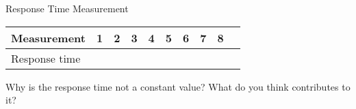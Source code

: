 \documentclass[10pt,a4paper,titlepage,oneside]{article}
\begin{document}
\begin{qa}{Response Time Measurement}
\begin{center}
\begin{tabular}{|l|c|c|c|c|c|c|c|c|c|}
	\hline
	Measurement   & 1 & 2 & 3 & 4 & 5 & 6 & 7 & 8\\\hline
	Response time &   &   &   &   &   &   &   &  \\\hline
\end{tabular}
\end{center}
\end{qa}


\begin{qa}{Why is the response time not a constant value? What do you think contributes to it?}

\end{qa}
\end{document}
